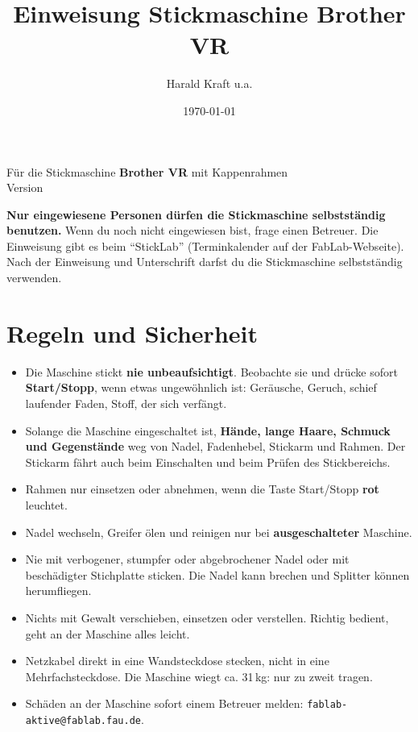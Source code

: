 \documentclass{\basedir/fablab-document}
\date{\today}
\author{Harald Kraft u.a.}
\title{Einweisung Stickmaschine Brother VR}
\begin{document}
	\maketitle
	\begin{center}
		Für die Stickmaschine \textbf{Brother VR} mit Kappenrahmen\\[1mm]
		{\small Version \Version}
	\end{center}

	\textbf{Nur eingewiesene Personen dürfen die Stickmaschine selbstständig benutzen.}
	Wenn du noch nicht eingewiesen bist, frage einen Betreuer. Die Einweisung gibt es beim \enquote{StickLab} (Terminkalender auf der FabLab-Webseite). Nach der Einweisung und Unterschrift darfst du die Stickmaschine selbstständig verwenden.

	\section{Regeln und Sicherheit}

	\begin{itemize}
		\item Die Maschine stickt \textbf{nie unbeaufsichtigt}. Beobachte sie und drücke sofort \textbf{Start/Stopp}, wenn etwas ungewöhnlich ist: Geräusche, Geruch, schief laufender Faden, Stoff, der sich verfängt.
		\item Solange die Maschine eingeschaltet ist, \textbf{Hände, lange Haare, Schmuck und Gegenstände} weg von Nadel, Fadenhebel, Stickarm und Rahmen. Der Stickarm fährt auch beim Einschalten und beim Prüfen des Stickbereichs.
		\item Rahmen nur einsetzen oder abnehmen, wenn die Taste Start/Stopp \textbf{rot} leuchtet.
		\item Nadel wechseln, Greifer ölen und reinigen nur bei \textbf{ausgeschalteter} Maschine.
		\item Nie mit verbogener, stumpfer oder abgebrochener Nadel oder mit beschädigter Stichplatte sticken. Die Nadel kann brechen und Splitter können herumfliegen.
		\item Nichts mit Gewalt verschieben, einsetzen oder verstellen. Richtig bedient, geht an der Maschine alles leicht.
		\item Netzkabel direkt in eine Wandsteckdose stecken, nicht in eine Mehrfachsteckdose. Die Maschine wiegt ca. 31\,kg: nur zu zweit tragen.
		\item Schäden an der Maschine sofort einem Betreuer melden: \texttt{fablab-aktive@fablab.fau.de}.
	\end{itemize}
\end{document}
